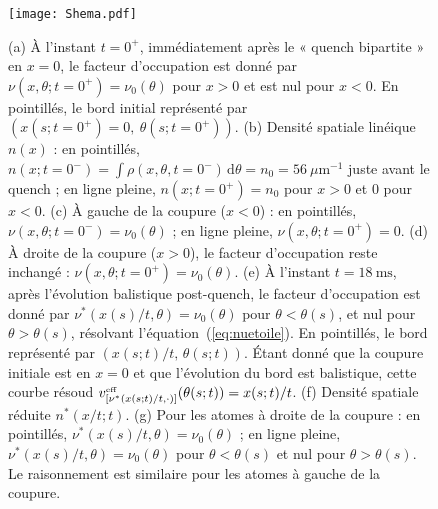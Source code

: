 \begin{figure}[H]
	\centering
	\texttt{[image: Shema.pdf]}
	\label{fig:BiPart.coupure1}
	\caption{
(a) À l'instant $t = 0^+$, immédiatement après le « quench bipartite » en $x = 0$, le facteur d'occupation est donné par $\nu(x, \theta ; t = 0^+) = \nu_0(\theta)$ pour $x > 0$ et est nul pour $x < 0$. En pointillés, le bord initial représenté par $(x(s; t = 0^+) = 0,\ \theta(s; t = 0^+))$.
(b) Densité spatiale linéique $n(x)$ : en pointillés, $n(x; t = 0^-) = \int \rho(x, \theta, t = 0^-) \, \mathrm{d}\theta = n_0 = 56~\mu\mathrm{m}^{-1}$ juste avant le quench ; en ligne pleine, $n(x; t = 0^+) = n_0$ pour $x > 0$ et $0$ pour $x < 0$.
(c) À gauche de la coupure ($x < 0$) : en pointillés, $\nu(x, \theta ; t = 0^-) = \nu_0(\theta)$ ; en ligne pleine, $\nu(x, \theta ; t = 0^+) = 0$.
(d) À droite de la coupure ($x > 0$), le facteur d'occupation reste inchangé : $\nu(x, \theta ; t = 0^+) = \nu_0(\theta)$.
(e) À l'instant $t = 18~\mathrm{ms}$, après l'évolution balistique post-quench, le facteur d'occupation est donné par $\nu^\ast(x(s)/t, \theta) = \nu_0(\theta)$ pour $\theta < \theta(s)$, et nul pour $\theta > \theta(s)$, résolvant l'équation~(\ref{eq:nuetoile}). En pointillés, le bord représenté par $(x(s; t)/t,\, \theta(s; t))$. Étant donné que la coupure initiale est en $x = 0$ et que l’évolution du bord est balistique, cette courbe résoud $v^{\mbox{\tiny eff}}_{[\nu^\ast(x(s; t)/t, \cdot) ]}(\theta(s; t)) = x(s; t)/t$.
(f) Densité spatiale réduite $n^\ast(x/t; t)$.
(g) Pour les atomes à droite de la coupure : en pointillés, $\nu^\ast(x(s)/t, \theta) = \nu_0(\theta)$ ; en ligne pleine, $\nu^\ast(x(s)/t, \theta) = \nu_0(\theta)$ pour $\theta < \theta(s)$ et nul pour $\theta > \theta(s)$. Le raisonnement est similaire pour les atomes à gauche de la coupure.
}
	
\end{figure}



